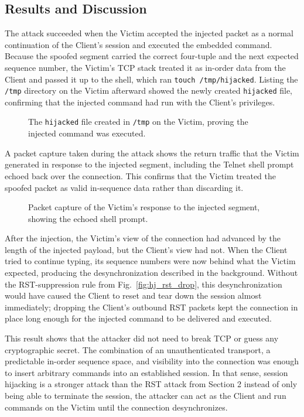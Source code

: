 \subsection{Results and Discussion}

The attack succeeded when the Victim accepted the injected packet as a normal continuation of the Client's session and executed the embedded command. Because the spoofed segment carried the correct four-tuple and the next expected sequence number, the Victim's TCP stack treated it as in-order data from the Client and passed it up to the shell, which ran \texttt{touch /tmp/hijacked}. Listing the \texttt{/tmp} directory on the Victim afterward showed the newly created \texttt{hijacked} file, confirming that the injected command had run with the Client's privileges.

\begin{figure}[!t]
\centering
{}
\caption{The \texttt{hijacked} file created in \texttt{/tmp} on the Victim, proving the injected command was executed.}
\label{fig:hj_proof}
\end{figure}

A packet capture taken during the attack shows the return traffic that the Victim generated in response to the injected segment, including the Telnet shell prompt echoed back over the connection. This confirms that the Victim treated the spoofed packet as valid in-sequence data rather than discarding it.

\begin{figure}[!t]
\centering
{}
\caption{Packet capture of the Victim's response to the injected segment, showing the echoed shell prompt.}
\label{fig:hj_return_capture}
\end{figure}

After the injection, the Victim's view of the connection had advanced by the length of the injected payload, but the Client's view had not. When the Client tried to continue typing, its sequence numbers were now behind what the Victim expected, producing the desynchronization described in the background. Without the RST-suppression rule from Fig.~\ref{fig:hj_rst_drop}, this desynchronization would have caused the Client to reset and tear down the session almost immediately; dropping the Client's outbound RST packets kept the connection in place long enough for the injected command to be delivered and executed.

This result shows that the attacker did not need to break TCP or guess any cryptographic secret. The combination of an unauthenticated transport, a predictable in-order sequence space, and visibility into the connection was enough to insert arbitrary commands into an established session. In that sense, session hijacking is a stronger attack than the RST attack from Section 2 instead of only being able to terminate the session, the attacker can act as the Client and run commands on the Victim until the connection desynchronizes.

